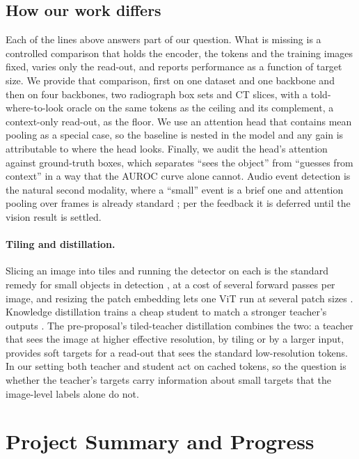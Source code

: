 \documentclass[10pt,letterpaper,twocolumn]{article}
\begin{document}
\subsection{How our work differs}
Each of the lines above answers part of our question. What is missing is a controlled comparison
that holds the encoder, the tokens and the training images fixed, varies only the read-out, and
reports performance as a function of target size. We provide that comparison, first on one
dataset and one backbone and then on four backbones, two radiograph box sets and CT slices,
with a told-where-to-look oracle on the same tokens as the ceiling and its complement, a
context-only read-out, as the floor. We use an
attention head that contains mean pooling as a special case, so the baseline is nested in the
model and any gain is attributable to where the head looks. Finally, we audit the head's
attention against ground-truth boxes, which separates ``sees the object'' from ``guesses from
context'' in a way that the AUROC curve alone cannot. Audio event detection is the natural second modality, where a ``small'' event is a brief one
and attention pooling over frames is already standard \citep{kong2019attention,chen2023beats};
per the feedback it is deferred until the vision result is settled.

\paragraph{Tiling and distillation.}
Slicing an image into tiles and running the detector on each is the standard remedy for small
objects in detection \citep{akyon2022sahi}, at a cost of several forward passes per image, and
resizing the patch embedding lets one ViT run at several patch sizes \citep{beyer2023flexivit}.
Knowledge distillation trains a cheap student to match a stronger teacher's outputs
\citep{hinton2015distilling}. The pre-proposal's tiled-teacher distillation combines the two:
a teacher that sees the image at higher effective resolution, by tiling or by a larger input,
provides soft targets for a read-out that sees the standard low-resolution tokens. In our
setting both teacher and student act on cached tokens, so the question is whether the
teacher's targets carry information about small targets that the image-level labels alone do
not.

\section{Project Summary and Progress}
\label{sec:progress}
\end{document}
